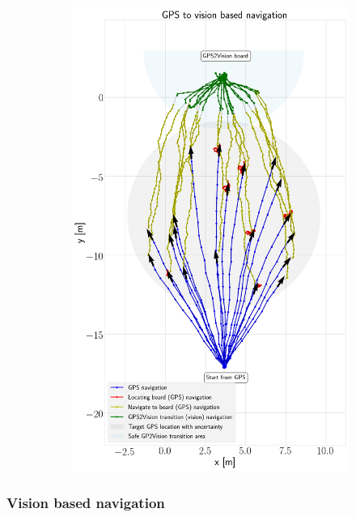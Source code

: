 \documentclass[../Head/report.tex]{subfiles}
\begin{document}
\begin{figure}[H]
\begin{subfigure}[t]{.45\textwidth}
        \includegraphics[width=\textwidth]{../Figures/GPS2Vision/test3_7-10ms_wind_20_runs/gps2vision.png}
        \caption{}
        \label{fig:GPS2Vision_test3}
    \end{subfigure}
    \caption{}
    \label{fig:GPS2Vision_test1_test3}
\end{figure}

\subsubsection{Vision based navigation}
\label{sec:vision_based_navigation}
\end{document}
